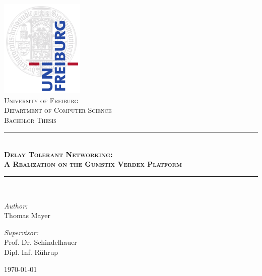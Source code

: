 
\begin{titlepage}
	\begin{center}
		\includegraphics[width=0.3\textwidth]{Images/unisiegel}\\[1cm]

		\textsc{\LARGE University of Freiburg}\\[0.5cm]
		\textsc{Department of Computer Science}\\[2cm]
		\textsc{\LARGE Bachelor Thesis}\\[0.5cm]

		\rule{\linewidth}{0.5mm} \\[0.4cm]
		\textsc{ \huge \bfseries Delay Tolerant Networking: \\[0.3cm] A Realization on the Gumstix Verdex Platform}\\[0.4cm]
		\rule{\linewidth}{0.5mm} \\[1.5cm]

		\begin{minipage}{0.4\textwidth}
			\begin{flushleft} \large
				\emph{Author:}\\
				Thomas Mayer
			\end{flushleft}
		\end{minipage}
		\begin{minipage}{0.4\textwidth}
			\begin{flushright} \large
				\emph{Supervisor:} \\
				Prof. Dr. Schindelhauer\\
				Dipl. Inf. Rührup
			\end{flushright}
		\end{minipage}

		\vfill
		{\large \today}
	\end{center}
\end{titlepage}